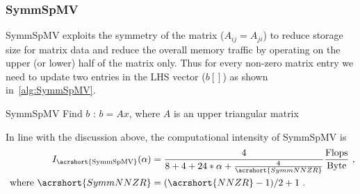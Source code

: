 \subsubsection{\acrshort{SymmSpMV}}
\label{sect:SymmSpmv}

\Acrfull{SymmSpMV} exploits the symmetry of the matrix ($A_{ij}=A_{ji}$) to reduce storage size for matrix data and reduce the overall memory traffic by operating on the upper (or lower) half of the matrix only. Thus for every non-zero matrix entry we need to update two entries in the LHS vector ($b[]$) as shown in~\cref{alg:SymmSpMV}.
\begin{algorithm}[tbp]
	\caption{SymmSpMV Find $b$ : $b=Ax$, where $A$ is an upper triangular matrix} 
	\label{alg:SymmSpMV}
	\begin{algorithmic}[1]
			\ENDFOR
		\ENDFOR
	\end{algorithmic}
\end{algorithm}
In line with the discussion above, the computational intensity of \acrshort{SymmSpMV} is
\begin{align}
\label{eq:SymmSpMV_intensity}
I_\mathrm{\acrshort{SymmSpMV}} (\alpha) &= \frac{4}{8+4+24*\alpha+\frac{4}{\acrshort{SymmNNZR}}} \frac{\FLOP}{\BYTE}\cma\\
\label{eq:NNZR_symm}
\text{ where  } \acrshort{SymmNNZR} &= (\acrshort{NNZR}-1)/2 + 1\eos
\end{align}

